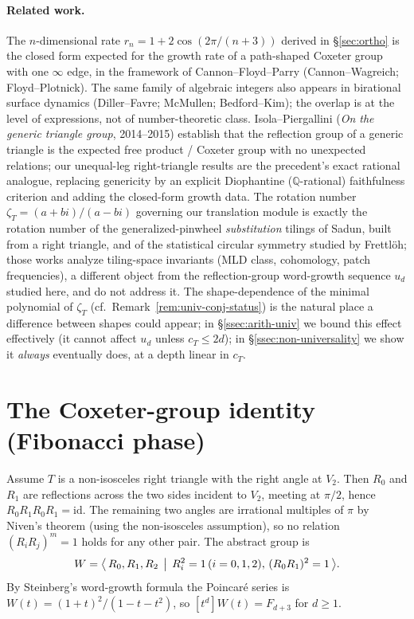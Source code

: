 \documentclass[11pt,a4paper]{article}
\theoremstyle{remark}
\theoremstyle{plain}
\begin{document}
\paragraph{Related work.}
The $n$-dimensional rate $r_n = 1 + 2\cos(2\pi/(n+3))$ derived in
\S\ref{sec:ortho} is the closed form expected for the growth rate of a
path-shaped Coxeter group with one $\infty$ edge, in the framework of
Cannon--Floyd--Parry (Cannon--Wagreich; Floyd--Plotnick).  The same
family of algebraic integers also appears in birational surface
dynamics (Diller--Favre; McMullen; Bedford--Kim); the overlap is at the
level of expressions, not of number-theoretic class.
Isola--Piergallini (\emph{On the generic triangle group}, 2014--2015)
establish that the reflection group of a generic triangle is the
expected free product / Coxeter group with no unexpected relations; our
unequal-leg right-triangle results are the precedent's exact rational
analogue, replacing genericity by an explicit Diophantine
($\mathbb{Q}$-rational) faithfulness criterion and adding the
closed-form growth data.
The rotation number $\zeta_T = (a+bi)/(a-bi)$ governing our translation
module is exactly the rotation number of the generalized-pinwheel
\emph{substitution} tilings of Sadun, built from a right triangle, and
of the statistical circular symmetry studied by Frettl\"oh; those works
analyze tiling-space invariants (MLD class, cohomology, patch
frequencies), a different object from the reflection-group word-growth
sequence $u_d$ studied here, and do not address it.  The shape-dependence
of the minimal polynomial of $\zeta_T$ (cf.\ Remark~\ref{rem:univ-conj-status})
is the natural place a difference between shapes could appear; in
\S\ref{ssec:arith-univ} we bound this effect effectively (it cannot
affect $u_d$ unless $c_T \le 2d$); in \S\ref{ssec:non-universality} we
show it \emph{always} eventually does, at a depth linear in $c_T$.

\section{The Coxeter-group identity (Fibonacci phase)}
\label{sec:fib}

Assume $T$ is a non-isosceles right triangle with the right angle at
$V_2$.  Then $R_0$ and $R_1$ are reflections across the two sides
incident to $V_2$, meeting at $\pi/2$, hence $R_0 R_1 R_0 R_1 = \mathrm{id}$.
The remaining two angles are irrational multiples of $\pi$ by Niven's
theorem (using the non-isosceles assumption), so no relation $(R_i R_j)^m = 1$
holds for any other pair.  The abstract group is
\[
W = \bigl\langle\, R_0, R_1, R_2 \,\bigm|\, R_i^2 = 1\,(i = 0,1,2),
\,(R_0 R_1)^2 = 1\,\bigr\rangle.
\]
By Steinberg's word-growth formula the Poincar\'e series is
$W(t) = (1+t)^2/(1 - t - t^2)$, so $[t^d] W(t) = F_{d+3}$ for $d \ge 1$.
\end{document}
